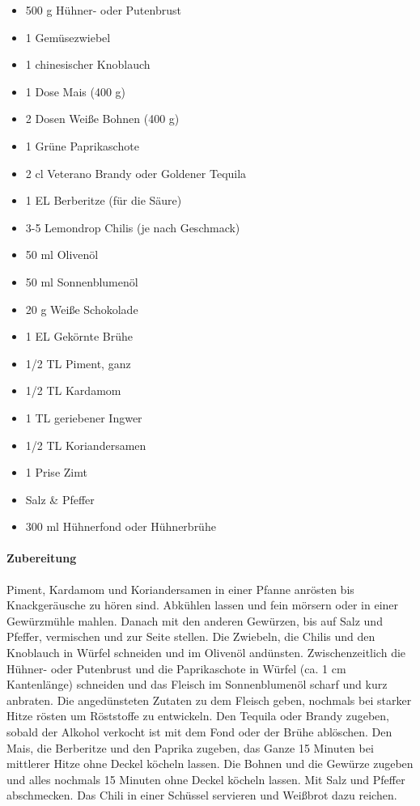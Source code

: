 \begin{itemize}[noitemsep]
	\item  500 g Hühner- oder Putenbrust
	\item 1 Gemüsezwiebel
	\item 1 chinesischer Knoblauch
	\item 1 Dose Mais (400 g)
	\item 2 Dosen Weiße Bohnen (400 g)
	\item 1 Grüne Paprikaschote
	\item 2 cl Veterano Brandy oder Goldener Tequila
	\item 1 EL Berberitze (für die Säure)
	\item 3-5 Lemondrop Chilis (je nach Geschmack)
	\item 50 ml Olivenöl
	\item 50 ml Sonnenblumenöl
	\item 20 g Weiße Schokolade
	\item 1 EL Gekörnte Brühe
	\item 1/2 TL Piment, ganz
	\item 1/2 TL Kardamom
	\item 1 TL geriebener Ingwer
	\item 1/2 TL Koriandersamen
	\item 1 Prise Zimt
	\item Salz \& Pfeffer
	\item 300 ml Hühnerfond oder Hühnerbrühe
\end{itemize}

\paragraph{Zubereitung}

Piment, Kardamom und Koriandersamen in einer Pfanne anrösten bis Knackgeräusche zu hören sind. Abkühlen lassen und fein mörsern oder in einer Gewürzmühle mahlen. Danach mit den anderen Gewürzen, bis auf Salz und Pfeffer, vermischen und zur Seite stellen.
Die Zwiebeln, die Chilis und den Knoblauch in Würfel schneiden und im Olivenöl andünsten. Zwischenzeitlich die Hühner- oder Putenbrust und die Paprikaschote in Würfel (ca. 1 cm Kantenlänge) schneiden und das Fleisch im Sonnenblumenöl scharf und kurz anbraten.
Die angedünsteten Zutaten zu dem Fleisch geben, nochmals bei starker Hitze rösten um Röststoffe zu entwickeln. Den Tequila oder Brandy zugeben, sobald der Alkohol verkocht ist mit dem Fond oder der Brühe ablöschen. Den Mais, die Berberitze  und den Paprika zugeben, das Ganze 15 Minuten bei mittlerer Hitze ohne Deckel köcheln lassen.  
Die Bohnen und die Gewürze zugeben und alles nochmals 15 Minuten ohne Deckel köcheln lassen. Mit Salz und Pfeffer abschmecken.
Das Chili in einer Schüssel servieren und Weißbrot dazu reichen.
\newpage

